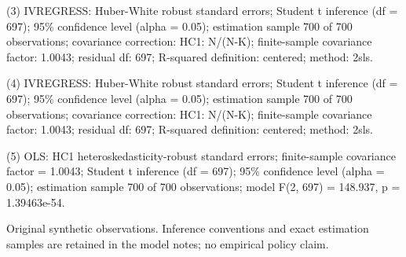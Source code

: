 \begin{table}[htbp]
\begin{minipage}{\linewidth}
(3) IVREGRESS: Huber-White robust standard errors; Student t inference (df = 697); 95\% confidence level (alpha = 0.05); estimation sample 700 of 700 observations; covariance correction: HC1: N/(N-K); finite-sample covariance factor: 1.0043; residual df: 697; R-squared definition: centered; method: 2sls.\par
(4) IVREGRESS: Huber-White robust standard errors; Student t inference (df = 697); 95\% confidence level (alpha = 0.05); estimation sample 700 of 700 observations; covariance correction: HC1: N/(N-K); finite-sample covariance factor: 1.0043; residual df: 697; R-squared definition: centered; method: 2sls.\par
(5) OLS: HC1 heteroskedasticity-robust standard errors; finite-sample covariance factor = 1.0043; Student t inference (df = 697); 95\% confidence level (alpha = 0.05); estimation sample 700 of 700 observations; model F(2, 697) = 148.937, p = 1.39463e-54.\par
Original synthetic observations. Inference conventions and exact estimation samples are retained in the model notes; no empirical policy claim.\par
\end{minipage}
\endgroup
\end{table}
